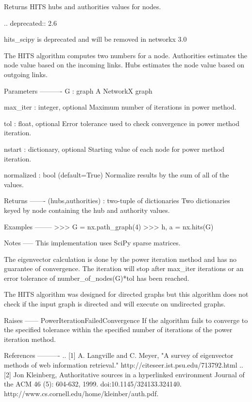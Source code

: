 \begin{DoxyVerb}Returns HITS hubs and authorities values for nodes.

.. deprecated:: 2.6

   hits_scipy is deprecated and will be removed in networkx 3.0

The HITS algorithm computes two numbers for a node.
Authorities estimates the node value based on the incoming links.
Hubs estimates the node value based on outgoing links.

Parameters
----------
G : graph
  A NetworkX graph

max_iter : integer, optional
  Maximum number of iterations in power method.

tol : float, optional
  Error tolerance used to check convergence in power method iteration.

nstart : dictionary, optional
  Starting value of each node for power method iteration.

normalized : bool (default=True)
   Normalize results by the sum of all of the values.

Returns
-------
(hubs,authorities) : two-tuple of dictionaries
   Two dictionaries keyed by node containing the hub and authority
   values.

Examples
--------
>>> G = nx.path_graph(4)
>>> h, a = nx.hits(G)

Notes
-----
This implementation uses SciPy sparse matrices.

The eigenvector calculation is done by the power iteration method
and has no guarantee of convergence.  The iteration will stop
after max_iter iterations or an error tolerance of
number_of_nodes(G)*tol has been reached.

The HITS algorithm was designed for directed graphs but this
algorithm does not check if the input graph is directed and will
execute on undirected graphs.

Raises
------
PowerIterationFailedConvergence
    If the algorithm fails to converge to the specified tolerance
    within the specified number of iterations of the power iteration
    method.

References
----------
.. [1] A. Langville and C. Meyer,
   "A survey of eigenvector methods of web information retrieval."
   http://citeseer.ist.psu.edu/713792.html
.. [2] Jon Kleinberg,
   Authoritative sources in a hyperlinked environment
   Journal of the ACM 46 (5): 604-632, 1999.
   doi:10.1145/324133.324140.
   http://www.cs.cornell.edu/home/kleinber/auth.pdf.
\end{DoxyVerb}
 \mbox{\label{namespacenetworkx_1_1algorithms_1_1link__analysis_1_1hits__alg_a9a88378eb91aabf0c7b7fe26a0881ffd}} 
